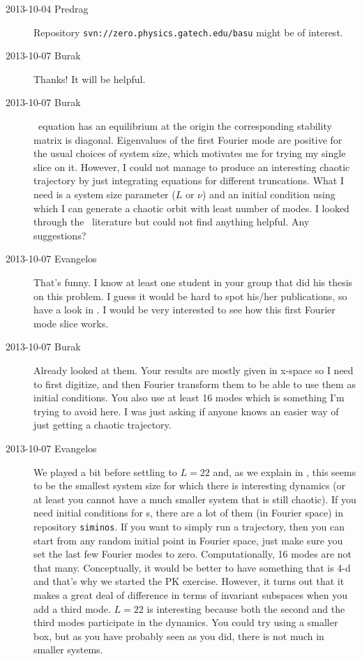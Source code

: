 \begin{description}
\item[2013-10-04 Predrag]
Repository \texttt{svn://zero.physics.gatech.edu/basu} might be of interest.

\item[2013-10-07 Burak] Thanks! It will be helpful.

\item[2013-10-07 Burak] \KS\ equation has an equilibrium at the origin the
corresponding stability matrix is diagonal. Eigenvalues of the first Fourier
mode are positive for the usual choices of system size, which motivates me 
for trying my single slice on it. However, I could not manage to produce an
interesting chaotic trajectory by just integrating equations for different 
truncations. What I need is a system size parameter ($L$ or $\nu$) and an
initial condition using which I can generate a chaotic orbit with least 
number of modes. I looked through the \KS\ literature but could not find 
anything helpful. Any suggestions?

\item[2013-10-07 Evangelos] That's funny. I know at least one student in your
group that did his thesis on this problem. I guess it would be hard to spot
his/her publications, so have a look in .
I would be very interested to see how this first Fourier mode slice works.

\item[2013-10-07 Burak] Already looked at them. Your results are mostly 
given in x-space so I need to first digitize, and then Fourier transform
them to be able to use them as initial conditions. You also use at least 
16 modes which is something I'm trying to avoid here. I was just asking 
if anyone knows an easier way of just getting a chaotic trajectory.

\item[2013-10-07 Evangelos] We played a bit before settling to $L=22$ and,
as we explain in , this seems to be the smallest
system size for which there is interesting dynamics (or at least you cannot 
have a much smaller system that is still chaotic). If you need initial
conditions for \rpo s, there are a lot of them (in Fourier space) in repository
\texttt{siminos}. If you want to simply run a trajectory, then you can start
from any random initial point in Fourier space, just make sure you set 
the last few Fourier modes to zero. Computationally, 16 modes are not that many.
Conceptually, it would be better to have something that is 4-d and that's
why we started the PK exercise. However, it turns out that it makes 
a great deal of difference in terms of invariant subspaces 
when you add a third mode. $L=22$ is interesting because both the second
and the third modes participate in the dynamics. You could try using a smaller
box, but as you have probably seen as you did, there is not much in smaller
systems.

\end{description}
\renewcommand{\ssp}{a}
